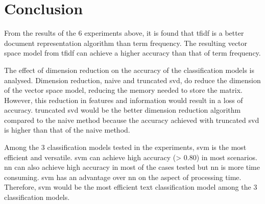 \clearpage
\section{Conclusion}
From the results of the 6 experiments above, it is found that \ac{tfidf} is a better document representation algorithm than term frequency. The resulting vector space model from \ac{tfidf} can achieve a higher accuracy than that of term frequency. 

The effect of dimension reduction on the accuracy of the classification models is analysed. Dimension reduction, naive and truncated \ac{svd}, do reduce the dimension of the vector space model, reducing the memory needed to store the matrix. However, this reduction in features and information would result in a loss of accuracy. truncated \ac{svd} would be the better dimension reduction algorithm compared to the naive method because the accuracy achieved with truncated \ac{svd} is higher than that of the naive method.

Among the 3 classification models tested in the experiments, \ac{svm} is the most efficient and versatile. \Ac{svm} can achieve high accuracy (> 0.80) in most scenarios. \Ac{nn} can also achieve high accuracy in most of the cases tested but \ac{nn} is more time consuming. \Ac{svm} has an advantage over \ac{nn} on the aspect of processing time. Therefore, \ac{svm} would be the most efficient text classification model among the 3 classification models.

